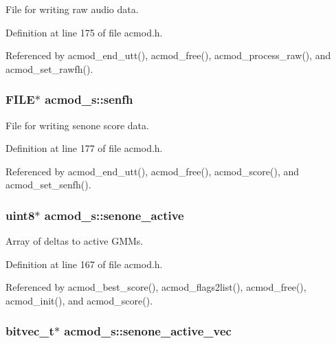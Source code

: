 File for writing raw audio data. 



Definition at line 175 of file acmod.\-h.



Referenced by acmod\-\_\-end\-\_\-utt(), acmod\-\_\-free(), acmod\-\_\-process\-\_\-raw(), and acmod\-\_\-set\-\_\-rawfh().

\subsubsection[{senfh}]{\setlength{\rightskip}{0pt plus 5cm}F\-I\-L\-E$\ast$ acmod\-\_\-s\-::senfh}\label{structacmod__s_aba97a9733b64074f3a4699dfbaed5ffd}


File for writing senone score data. 



Definition at line 177 of file acmod.\-h.



Referenced by acmod\-\_\-end\-\_\-utt(), acmod\-\_\-free(), acmod\-\_\-score(), and acmod\-\_\-set\-\_\-senfh().

\subsubsection[{senone\-\_\-active}]{\setlength{\rightskip}{0pt plus 5cm}uint8$\ast$ acmod\-\_\-s\-::senone\-\_\-active}\label{structacmod__s_a5c98c727daf4e6bb23534e00b30cb5c2}


Array of deltas to active G\-M\-Ms. 



Definition at line 167 of file acmod.\-h.



Referenced by acmod\-\_\-best\-\_\-score(), acmod\-\_\-flags2list(), acmod\-\_\-free(), acmod\-\_\-init(), and acmod\-\_\-score().

\subsubsection[{senone\-\_\-active\-\_\-vec}]{\setlength{\rightskip}{0pt plus 5cm}bitvec\-\_\-t$\ast$ acmod\-\_\-s\-::senone\-\_\-active\-\_\-vec}\label{structacmod__s_a4a3ad3a3dc9a7b36c024c77729012e55}


